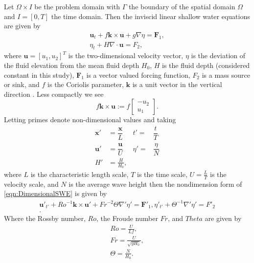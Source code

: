 Let $\Omega \times I$ be the problem domain with $\Gamma$ the boundary of the
spatial domain $\Omega$ and $I = [0, T]$ the time domain.  Then the inviscid
linear shallow water equations are given by
\begin{equation}
  \begin{split}
    \mathbf{u}_t + f\mathbf{k} \times \mathbf{u} + g \nabla \eta = \mathbf{F}_1, \\
    \eta_t + H \nabla\cdot \mathbf{u} = F_2,
  \end{split}
  \label{eqn:DimensionalSWE}
\end{equation}
where $\mathbf{u}=[u_1,u_2]^T$ is the two-dimensional velocity vector, $\eta$ is the
deviation of the fluid elevation from the mean fluid depth $H_0$, $H$ is the
fluid depth (considered constant in this study), $\mathbf{F}_1$ is a vector valued
forcing function, $F_2$ is a mass source or sink, and $f$ is the Coriolis
parameter, $\mathbf{k}$ is a unit vector in the vertical direction
\cite{Hanert2004, LeBlond1981, Le-Roux1998}.  Less compactly we see
\begin{equation}
  f\mathbf{k} \times \mathbf{u} := f\begin{bmatrix}
    -u_2 \\
    u_1
  \end{bmatrix}.
  \label{eqn:Coriolis}
\end{equation}
Letting primes denote non-dimensional values and taking
\begin{align*}
    \mathbf{x}' &= \dfrac{\mathbf{x}}{L} &t' =& \dfrac{t}{T} \\[1em]
    \mathbf{u}' &= \dfrac{\mathbf{u}}{U} &\eta' =& \dfrac{\eta}{N} \\[1em]
    H' &= \frac{H}{H_0},
\end{align*}
where $L$ is the characteristic length scale, $T$ is the time scale,
$U=\frac{L}{T}$ is the velocity scale, and $N$ is the average wave height then
the nondimension form of \eqref{eqn:DimensionalSWE} is given by
\begin{equation}
  \begin{split}
    \mathbf{u}'_{t'} + Ro^{-1} \mathbf{k}\times\mathbf{u}' 
        + Fr^{-2} \Theta \nabla' \eta' = \mathbf{F}'_1, 
      \eta'_{t'} + \Theta^{-1} \nabla' \eta' = F'_2 \\.
  \end{split}
  \label{eqn:NondimensionalSWE}
\end{equation}
Where the Rossby number, $Ro$, the Froude number $Fr$, and $Theta$ are given by
\begin{align}
  Ro = \frac{U}{Lf}, \label{eqn:Rossby} \\
  Fr = \frac{U}{\sqrt{gH_0}}, \label{eqn:Froude} \\
  \Theta = \frac{N}{H_0}. \label{eqn:Theta}
\end{align}
